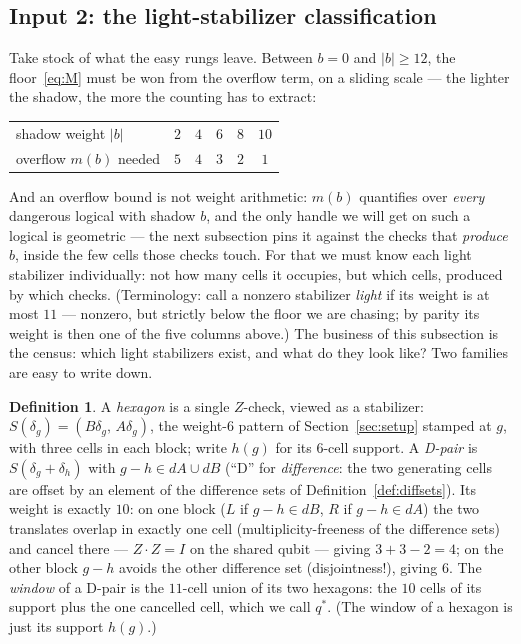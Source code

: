 \documentclass[11pt]{article}
\theoremstyle{plain}
\theoremstyle{definition}
\newtheorem{definition}[theorem]{Definition}
\theoremstyle{remark}
\newcommand{\wt}[1]{\lvert #1\rvert}
\begin{document}
\subsection{Input 2: the light-stabilizer classification}

Take stock of what the easy rungs leave. Between $b = 0$ and $\wt{b} \geq
12$, the floor~\eqref{eq:M} must be won from the overflow term, on a
sliding scale --- the lighter the shadow, the more the counting has to
extract:
\begin{center}
\begin{tabular}{lccccc}
\toprule
shadow weight $\wt{b}$ & $2$ & $4$ & $6$ & $8$ & $10$\\
overflow $m(b)$ needed & $5$ & $4$ & $3$ & $2$ & $1$\\
\bottomrule
\end{tabular}
\end{center}
And an overflow bound is not weight arithmetic: $m(b)$ quantifies over
\emph{every} dangerous logical with shadow $b$, and the only handle we will
get on such a logical is geometric --- the next subsection pins it against
the checks that \emph{produce} $b$, inside the few cells those checks
touch. For that we must know each light stabilizer individually: not how
many cells it occupies, but which cells, produced by which checks.
(Terminology: call a nonzero stabilizer \emph{light} if its weight is at
most $11$ --- nonzero, but strictly below the floor we are chasing; by
parity its weight is then one of the five columns above.) The business of
this subsection is the census: which light stabilizers exist, and what do
they look like? Two families are easy to write down.

\begin{definition}\label{def:hexdpair}
A \emph{hexagon} is a single $Z$-check, viewed as a stabilizer:
$S(\delta_g) = (B\delta_g,\, A\delta_g)$, the weight-6 pattern of
Section~\ref{sec:setup} stamped at $g$, with three cells in each block; write
$h(g)$ for its 6-cell support. A \emph{D-pair} is $S(\delta_g + \delta_h)$
with $g - h \in dA \cup dB$ (``D'' for \emph{difference}: the two generating
cells are offset by an element of the difference sets of
Definition~\ref{def:diffsets}). Its weight is exactly $10$: on one block
($L$ if $g - h \in dB$, $R$ if $g - h \in dA$) the two translates overlap in
exactly one cell (multiplicity-freeness of the difference sets) and cancel
there --- $Z \cdot Z = I$ on the shared qubit --- giving $3 + 3 - 2 = 4$; on
the other block $g - h$ avoids the other difference set (disjointness!),
giving $6$. The \emph{window} of a D-pair is the $11$-cell union of its two
hexagons: the $10$ cells of its support plus the one cancelled cell, which
we call $q^*$. (The window of a hexagon is just its support $h(g)$.)
\end{definition}
\end{document}
